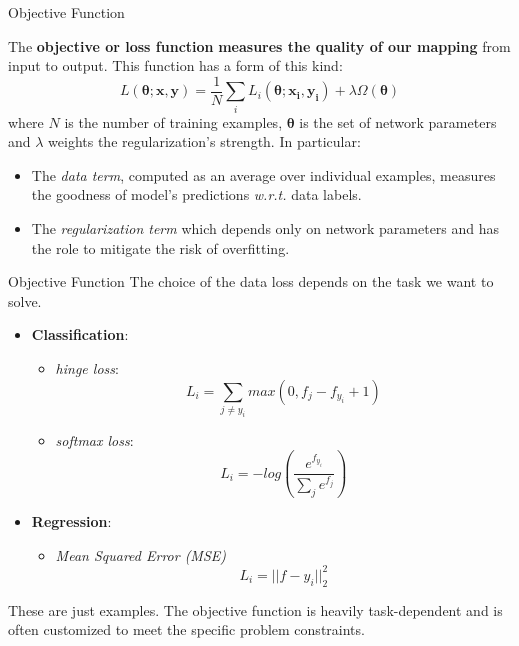 \documentclass[aspectratio=169]{beamer}
\begin{document}
\begin{frame}{Objective Function}

The \textbf{objective or loss function} \textbf{measures the quality of our mapping} from input to output. This function has a form of this kind:
\begin{equation*}
L(\bm{\theta}; \mathbf{x, y})=\frac{1}{N} \sum_i L_i(\bm{\theta}; \mathbf{x_i, y_i}) + \lambda \Omega (\bm{\theta})
\end{equation*}
where $N$ is the number of training examples, $\bm{\theta}$ is the set of network parameters and $\lambda$ weights the regularization's strength.
In particular:
\begin{itemize}
\item The \emph{data term}, computed as an average over individual examples, measures the goodness of model's predictions \textit{w.r.t.} data labels. 
\item The \emph{regularization term} which depends only on network parameters and has the role to mitigate the risk of overfitting.
\end{itemize}
\end{frame}


\begin{frame}{Objective Function}
The choice of the data loss depends on the task we want to solve.
\begin{itemize}
	\item \textbf{Classification}:
	\begin{itemize}
		\item \emph{hinge loss}:
		\begin{equation}
		L_i = \sum_{j\neq y_i}max(0, f_j - f_{y_i} + 1)
		\end{equation}
		\item \emph{softmax loss}:
		\begin{equation}
		L_i = -log\left(\frac{e^{f_{y_i}}}{\sum_j e^{f_j}}\right)
		\end{equation}
	\end{itemize}
	\item \textbf{Regression}:
	\begin{itemize}
		\item \emph{Mean Squared Error (MSE)}
		\begin{equation}
		L_i = || f - y_i ||^2_2
		\end{equation}
	\end{itemize}
\end{itemize}
These are just examples. The objective function is heavily task-dependent and is often customized to meet the specific problem constraints.
\end{frame}
\end{document}
